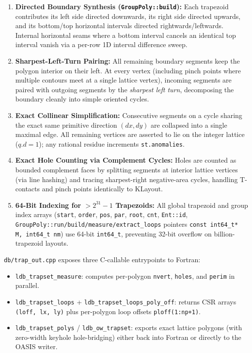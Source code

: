 \begin{enumerate}
  \item \textbf{Directed Boundary Synthesis (\texttt{GroupPoly::build}):} Each trapezoid contributes its left side directed downwards, its right side directed upwards, and its bottom/top horizontal intervals directed rightwards/leftwards. Internal horizontal seams where a bottom interval cancels an identical top interval vanish via a per-row 1D interval difference sweep.
  \item \textbf{Sharpest-Left-Turn Pairing:} All remaining boundary segments keep the polygon interior on their left. At every vertex (including pinch points where multiple contours meet at a single lattice vertex), incoming segments are paired with outgoing segments by the \emph{sharpest left turn}, decomposing the boundary cleanly into simple oriented cycles.
  \item \textbf{Exact Collinear Simplification:} Consecutive segments on a cycle sharing the exact same primitive direction $(dx, dy)$ are collapsed into a single maximal edge. All remaining vertices are asserted to lie on the integer lattice ($q.d = 1$); any rational residue increments \texttt{st.anomalies}.
  \item \textbf{Exact Hole Counting via Complement Cycles:} Holes are counted as bounded complement faces by splitting segments at interior lattice vertices (via line hashing) and tracing sharpest-right negative-area cycles, handling T-contacts and pinch points identically to KLayout.
  \item \textbf{64-Bit Indexing for $> 2^{31}-1$ Trapezoids:} All global trapezoid and group index arrays (\texttt{start}, \texttt{order}, \texttt{pos}, \texttt{par}, \texttt{root}, \texttt{cnt}, \texttt{Ent::id}, \texttt{GroupPoly::run/build/measure/extract\_loops} pointers \texttt{const int64\_t* M, int64\_t nm}) use 64-bit \texttt{int64\_t}, preventing 32-bit overflow on billion-trapezoid layouts.
\end{enumerate}

\texttt{db/trap\_out.cpp} exposes three C-callable entrypoints to Fortran:
\begin{itemize}
  \item \texttt{ldb\_trapset\_measure}: computes per-polygon \texttt{nvert}, \texttt{holes}, and \texttt{perim} in parallel.
  \item \texttt{ldb\_trapset\_loops} + \texttt{ldb\_trapset\_loops\_poly\_off}: returns CSR arrays \texttt{(loff, lx, ly)} plus per-polygon loop offsets \texttt{ploff(1:np+1)}.
  \item \texttt{ldb\_trapset\_polys} / \texttt{ldb\_ow\_trapset}: exports exact lattice polygons (with zero-width keyhole hole-bridging) either back into Fortran or directly to the OASIS writer.
\end{itemize}

